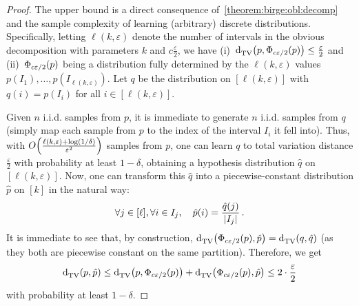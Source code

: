 \documentclass[11pt]{article}
\newcommand{\dst}{\varepsilon}
\newcommand{\ab}{k}
\newcommand{\ns}{n}
\newcommand{\p}{p}
\newcommand{\q}{q}
\begin{document}
\begin{proof}
The upper bound is a direct consequence of~\autoref{theorem:birge:obl:decomp} and the sample complexity of learning (arbitrary) discrete distributions. Specifically, letting $\ell(\ab,\dst)$ denote the number of intervals in the obvious decomposition with parameters $\ab$ and $c\frac{\dst}{2}$, we have (i)~$\totalvardist{\p}{\birge[\p]{c\dst/2}} \leq \frac{\dst}{2}$ and (ii)~$\birge[\p]{c\dst/2}$ being a distribution fully determined by the $\ell(\ab,\dst)$ values $\p(I_1), \dots, \p(I_{\ell(\ab,\dst)})$. Let $\q$ be the distribution on $[\ell(\ab,\dst)]$ with $\q(i) = \p(I_i)$ for all $i\in[\ell(\ab,\dst)]$.

Given $\ns$ i.i.d. samples from $\p$, it is immediate to generate $\ns$ i.i.d. samples from $\q$ (simply map each sample from $\p$ to the index of the interval $I_i$ it fell into). Thus, with $\bigO{\frac{\ell(\ab,\dst)+\log(1/\delta)}{\dst^2}}$ samples from $\p$, one can learn $\q$ to total variation distance $\frac{\dst}{2}$ with probability at least $1-\delta$, obtaining a hypothesis distribution $\hat{\q}$ on $[\ell(\ab,\dst)]$. Now, one can transform this $\hat{\q}$ into a piecewise-constant distribution $\hat{\p}$ on $[\ab]$ in the natural way:
\begin{equation}\label{eq:expanding}
  \forall j\in [\ell], \forall i\in I_j,\quad \hat{\p}(i) = \frac{\hat{\q}(j)}{\abs{I_j}}\,.
\end{equation}
It is immediate to see that, by construction, $\totalvardist{\birge[\p]{c\dst/2}}{\hat{\p}} = \totalvardist{\q}{\hat{\q}}$ (as they both are piecewise constant on the same partition). Therefore, we get
\[
    \totalvardist{\p}{\hat{\p}} \leq \totalvardist{\p}{\birge[\p]{c\dst/2}}+\totalvardist{\birge[\p]{c\dst/2}}{\hat{\p}} \leq 2\cdot \frac{\dst}{2}
\]
with probability at least $1-\delta$.\medskip


\end{proof}
\end{document}
